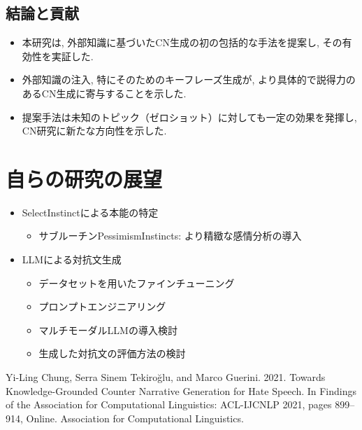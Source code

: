 \documentclass[dvipdfmx]{jsarticle}
\begin{document}
\vspace{0.5em}

\subsection{結論と貢献}

\begin{itemize}
  \item 本研究は, 外部知識に基づいたCN生成の初の包括的な手法を提案し, その有効性を実証した.
  \item 外部知識の注入, 特にそのためのキーフレーズ生成が, より具体的で説得力のあるCN生成に寄与することを示した.
  \item 提案手法は未知のトピック（ゼロショット）に対しても一定の効果を発揮し, CN研究に新たな方向性を示した.
\end{itemize}

\vspace{0.5em}

\section{自らの研究の展望}

\begin{itemize}
  \item SelectInstinctによる本能の特定
        \begin{itemize}
          \item サブルーチンPessimismInstincts: より精緻な感情分析の導入
        \end{itemize}

        \vspace{0.5em}

  \item LLMによる対抗文生成
        \begin{itemize}
          \item データセットを用いたファインチューニング
          \item プロンプトエンジニアリング
          \item マルチモーダルLLMの導入検討
          \item 生成した対抗文の評価方法の検討
        \end{itemize}
\end{itemize}

\vspace{1em}

\begin{thebibliography}{99}
  Yi-Ling Chung, Serra Sinem Tekiroğlu, and Marco Guerini. 2021. Towards Knowledge-Grounded Counter Narrative Generation for Hate Speech. In Findings of the Association for Computational Linguistics: ACL-IJCNLP 2021, pages 899–914, Online. Association for Computational Linguistics.

\end{thebibliography}
\end{document}
